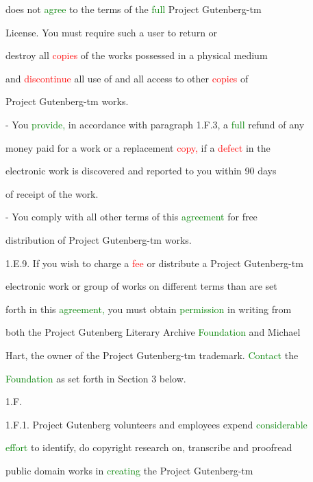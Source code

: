  does not \textcolor{green}{agree} to the terms of the \textcolor{green}{full} Project Gutenberg-tm

 License. You must require such a user to return or

 destroy all \textcolor{red}{copies} of the works \textcolor{BurntOrange}{possessed} in a physical medium

 and \textcolor{red}{discontinue} all use of and all access to other \textcolor{red}{copies} of

 Project Gutenberg-tm works.



 - You \textcolor{green}{provide,} in accordance with paragraph 1.F.3, a \textcolor{green}{full} refund of any

 \textcolor{BurntOrange}{money} paid for a work or a replacement \textcolor{red}{copy,} if a \textcolor{red}{defect} in the

 electronic work is discovered and reported to you within 90 days

 of receipt of the work.



 - You comply with all other terms of this \textcolor{green}{agreement} for free

 distribution of Project Gutenberg-tm works.



 1.E.9. If you wish to charge a \textcolor{red}{fee} or distribute a Project Gutenberg-tm

 electronic work or group of works on different terms than are set

 forth in this \textcolor{green}{agreement,} you must obtain \textcolor{green}{permission} in writing from

 both the Project Gutenberg Literary Archive \textcolor{green}{Foundation} and Michael

 Hart, the owner of the Project Gutenberg-tm trademark. \textcolor{green}{Contact} the

 \textcolor{green}{Foundation} as set forth in Section 3 below.



 1.F.



 1.F.1. Project Gutenberg \textcolor{BurntOrange}{volunteers} and employees expend \textcolor{green}{considerable}

 \textcolor{green}{effort} to identify, do copyright research on, transcribe and proofread

 \textcolor{BurntOrange}{public} domain works in \textcolor{green}{creating} the Project Gutenberg-tm

